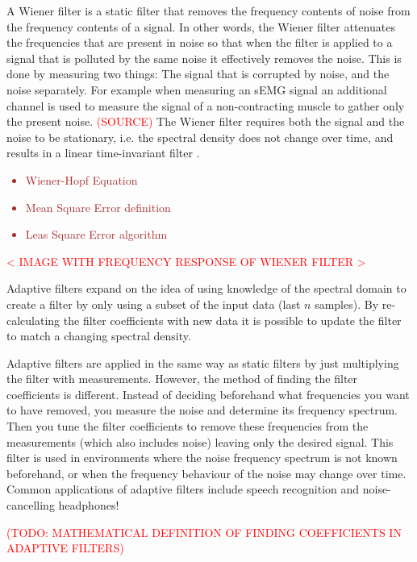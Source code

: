 A Wiener filter is a static filter that removes the frequency contents of noise from the frequency contents of a signal. In other words, the Wiener filter attenuates the frequencies that are present in noise so that when the filter is applied to a signal that is polluted by the same noise it effectively removes the noise. This is done by measuring two things: The signal that is corrupted by noise, and the noise separately. For example when measuring an sEMG signal an additional channel is used to measure the signal of a non-contracting muscle to gather only the present noise. \textcolor{red}{(SOURCE)}
The Wiener filter requires both the signal and the noise to be stationary, i.e. the spectral density does not change over time, and results in a linear time-invariant filter \cite{wiki:Stationary_process} \cite{difference_stationary_nonstationary}.  

\textcolor{brown}{\begin{itemize}
    \item Wiener-Hopf Equation
    \item Mean Square Error definition
    \item Leas Square Error algorithm
\end{itemize}}

\textcolor{red}{< IMAGE WITH FREQUENCY RESPONSE OF WIENER FILTER > }

Adaptive filters expand on the idea of using knowledge of the spectral domain to create a filter by only using a subset of the input data (last $n$ samples). By re-calculating the filter coefficients with new data it is possible to update the filter to match a changing spectral density. 

Adaptive filters are applied in the same way as static filters by just multiplying the filter with measurements. However, the  method of finding the filter coefficients is different. Instead of deciding beforehand what frequencies you want to have removed, you measure the noise and determine its frequency spectrum. Then you tune the filter coefficients to remove these frequencies from the measurements (which also includes noise) leaving only the desired signal. This filter is used in environments where the noise frequency spectrum is not known beforehand, or when the frequency behaviour of the noise may change over time. Common applications of adaptive filters include speech recognition and noise-cancelling headphones! \cite{wiener_vs_adaptive_realtime_noisecancellation}

\textcolor{red}{(TODO: MATHEMATICAL DEFINITION OF FINDING COEFFICIENTS IN ADAPTIVE FILTERS) }

